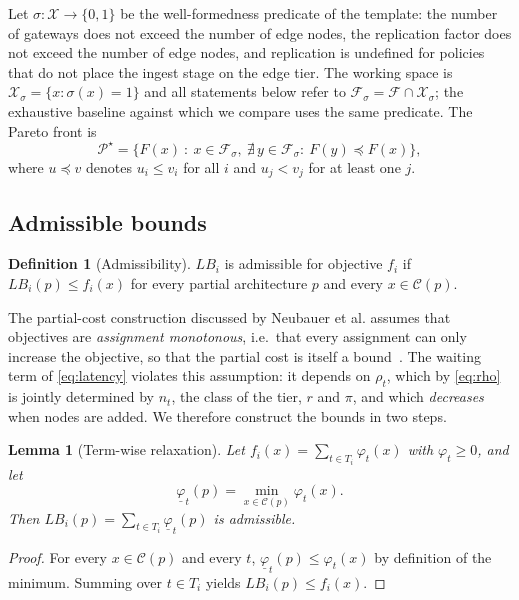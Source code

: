 \documentclass[preprint,11pt,3p]{elsarticle}
\theoremstyle{plain}
\newtheorem{lemma}{Lemma}
\theoremstyle{definition}
\newtheorem{definition}{Definition}
\newcommand{\X}{\mathcal{X}}
\newcommand{\C}{\mathcal{C}}
\newcommand{\F}{\mathcal{F}}
\newcommand{\PS}{\mathcal{P}^{\star}}
\newcommand{\LB}{\mathit{LB}}
\begin{document}
Let $\sigma:\X\to\{0,1\}$ be the well-formedness predicate of the template: the number of
gateways does not exceed the number of edge nodes, the replication factor does not exceed
the number of edge nodes, and replication is undefined for policies that do not place the
ingest stage on the edge tier. The working space is $\X_\sigma=\{x:\sigma(x)=1\}$ and all
statements below refer to $\F_\sigma=\F\cap\X_\sigma$; the exhaustive baseline against
which we compare uses the same predicate. The Pareto front is
\begin{equation}
\PS=\{F(x)\ :\ x\in\F_\sigma,\ \nexists\,y\in\F_\sigma:\ F(y)\preceq F(x)\},
\end{equation}
where $u\preceq v$ denotes $u_i\le v_i$ for all $i$ and $u_j<v_j$ for at least one $j$.

\subsection{Admissible bounds}

\begin{definition}[Admissibility]
$\LB_i$ is admissible for objective $f_i$ if
$\LB_i(p)\le f_i(x)$ for every partial architecture $p$ and every $x\in\C(p)$.
\end{definition}

The partial-cost construction discussed by Neubauer et al. assumes that objectives are
\emph{assignment monotonous}, i.e.\ that every assignment can only increase the objective,
so that the partial cost is itself a bound~\cite{neubauer2018exact}. The waiting term of
\eqref{eq:latency} violates this assumption: it depends on $\rho_t$, which by
\eqref{eq:rho} is jointly determined by $n_t$, the class of the tier, $r$ and $\pi$, and
which \emph{decreases} when nodes are added. We therefore construct the bounds in two
steps.

\begin{lemma}[Term-wise relaxation]
\label{lem:relax}
Let $f_i(x)=\sum_{t\in T_i}\varphi_t(x)$ with $\varphi_t\ge0$, and let
\begin{equation*}
\underline{\varphi}_t(p)=\min_{x\in\C(p)}\varphi_t(x).
\end{equation*}
Then $\LB_i(p)=\sum_{t\in T_i}\underline{\varphi}_t(p)$ is admissible.
\end{lemma}
\begin{proof}
For every $x\in\C(p)$ and every $t$, $\underline{\varphi}_t(p)\le\varphi_t(x)$ by
definition of the minimum. Summing over $t\in T_i$ yields $\LB_i(p)\le f_i(x)$.
\end{proof}
\end{document}
